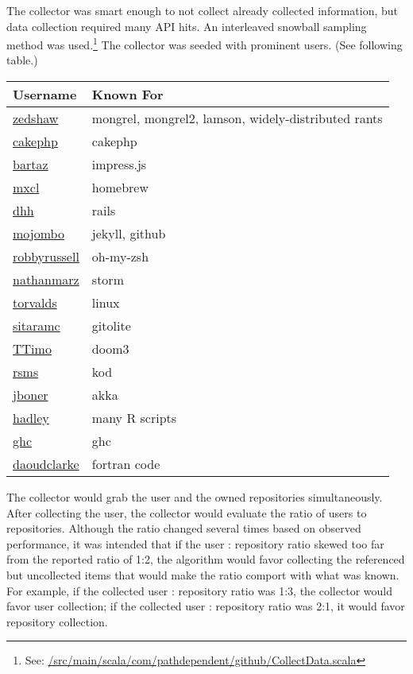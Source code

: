 \documentclass{article}
\begin{document}
  The collector was smart enough to not collect already collected information, but data collection required many API hits. An interleaved snowball sampling method was used.\footnote{See: \href{https://github.com/jbn/GitHubRecommendations/blob/master/src/main/scala/com/pathdependent/github/CollectData.scala}{/src/main/scala/com/pathdependent/github/CollectData.scala}} The collector was seeded with prominent users. (See following table.)

  \begin{center}
    \begin{tabular}{ | l | l |}
    \hline
    Username & Known For \\ \hline
    \href{https://github.com/zedshaw}{zedshaw} & mongrel, mongrel2, lamson, widely-distributed rants \\
    \href{https://github.com/cakephp}{cakephp}       & cakephp \\
    \href{https://github.com/bartaz}{bartaz}        & impress.js \\
    \href{https://github.com/mxcl}{mxcl}          & homebrew \\
    \href{https://github.com/dhh}{dhh}          & rails \\
    \href{https://github.com/mojombo}{mojombo}       & jekyll, github \\
    \href{https://github.com/robbyrussell}{robbyrussell}  & oh-my-zsh \\
    \href{https://github.com/nathanmarz}{nathanmarz}    & storm \\
    \href{https://github.com/torvalds}{torvalds}      & linux \\
    \href{https://github.com/sitaramc}{sitaramc}      & gitolite \\
    \href{https://github.com/TTimo}{TTimo}         & doom3 \\
    \href{https://github.com/rsms}{rsms}          & kod \\
    \href{https://github.com/jboner}{jboner}       & akka \\
    \href{https://github.com/hadley}{hadley}        & many R scripts \\
    \href{https://github.com/ghc}{ghc}           & ghc \\
    \href{https://github.com/daoudclarke}{daoudclarke}   & fortran code \\
    \hline
    \end{tabular}
  \end{center}

  The collector would grab the user and the owned repositories simultaneously. After collecting the user, the collector would evaluate the ratio of users to repositories. Although the ratio changed several times based on observed performance, it was intended that if the user : repository ratio skewed too far from the reported ratio of 1:2, the algorithm would favor collecting the referenced but uncollected items that would make the ratio comport with what was known. For example, if the collected user : repository ratio was 1:3, the collector would favor user collection; if the collected user : repository ratio was 2:1, it would favor repository collection.
\end{document}
